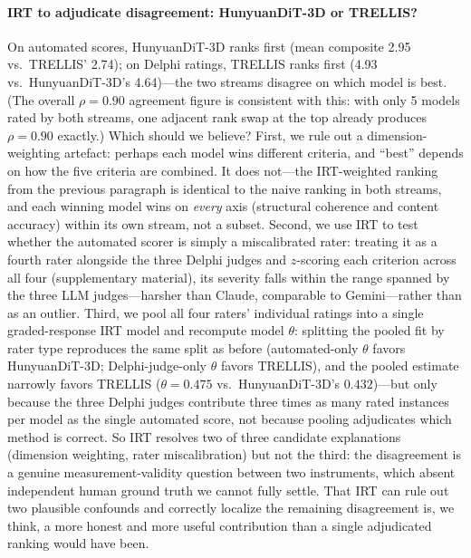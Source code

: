 \documentclass[10pt]{article}
\begin{document}
\paragraph{IRT to adjudicate disagreement: HunyuanDiT-3D or TRELLIS?}
On automated scores, HunyuanDiT-3D ranks first (mean composite 2.95 vs.\
TRELLIS' 2.74); on Delphi ratings, TRELLIS ranks first (4.93 vs.\
HunyuanDiT-3D's 4.64)---the two streams disagree on which model is best.
(The overall $\rho=0.90$ agreement figure is consistent with this: with
only 5 models rated by both streams, one adjacent rank swap at the top
already produces $\rho=0.90$ exactly.) Which should we believe?
First, we rule out a dimension-weighting artefact: perhaps each model wins
different criteria, and ``best'' depends on how the five criteria are
combined. It does not---the IRT-weighted ranking from the previous
paragraph is identical to the naive ranking in both streams, and each
winning model wins on \emph{every} axis (structural coherence and content
accuracy) within its own stream, not a subset. Second, we use IRT to test
whether the automated scorer is simply a miscalibrated rater: treating it
as a fourth rater alongside the three Delphi judges and $z$-scoring each
criterion across all four (supplementary material), its severity falls
within the range spanned by the three LLM judges---harsher than Claude,
comparable to Gemini---rather than as an outlier. Third, we pool all four
raters' individual ratings into a single graded-response IRT model and
recompute model $\theta$: splitting the pooled fit by rater type
reproduces the same split as before (automated-only $\theta$ favors
HunyuanDiT-3D; Delphi-judge-only $\theta$ favors TRELLIS), and the pooled
estimate narrowly favors TRELLIS ($\theta=0.475$ vs.\ HunyuanDiT-3D's
$0.432$)---but only because the three Delphi judges contribute three times
as many rated instances per model as the single automated score, not
because pooling adjudicates which method is correct. So IRT resolves two
of three candidate explanations (dimension weighting, rater
miscalibration) but not the third: the disagreement is a genuine
measurement-validity question between two instruments, which absent
independent human ground truth we cannot fully settle. That IRT can rule
out two plausible confounds and correctly localize the remaining
disagreement is, we think, a more honest and more useful contribution
than a single adjudicated ranking would have been.
\end{document}
